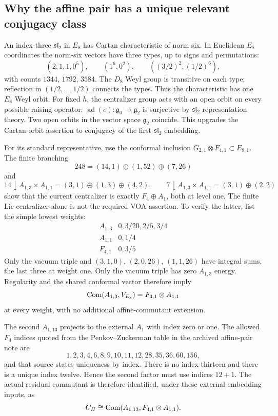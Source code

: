 \subsection{Why the affine pair has a unique relevant conjugacy class}

An index-three $\mathfrak{sl}_2$ in $E_8$ has Cartan characteristic
of norm six. In Euclidean $E_8$ coordinates the norm-six vectors
have three types, up to signs and permutations:
\[
 (2,1,1,0^5),\qquad (1^6,0^2),\qquad
 ((3/2)^2,(1/2)^6),
\]
with counts $1344$, $1792$, $3584$. The $D_8$ Weyl group is
transitive on each type; reflection in
$(1/2,\ldots,1/2)$ connects the types. Thus the characteristic
has one $E_8$ Weyl orbit. For fixed $h$, the centralizer group
acts with an open orbit on every possible raising operator:
$\operatorname{ad}(e):\mathfrak g_0\to\mathfrak g_2$ is
surjective by $\mathfrak{sl}_2$ representation theory. Two open
orbits in the vector space $\mathfrak g_2$ coincide. This
upgrades the Cartan-orbit assertion to conjugacy of the first
$\mathfrak{sl}_2$ embedding.

For its standard representative, use the conformal inclusion
$G_{2,1}\otimes F_{4,1}\subset E_{8,1}$. The finite branching
\[
 248=(14,1)\oplus(1,52)\oplus(7,26)
\]
and
\[
 14\downarrow A_{1,3}\times A_{1,1}
 =(3,1)\oplus(1,3)\oplus(4,2),
 \qquad
 7\downarrow A_{1,3}\times A_{1,1}=(3,1)\oplus(2,2)
\]
show that the current centralizer is exactly
$F_4\oplus A_1$, both at level one. The finite Lie centralizer
alone is not the required VOA assertion. To verify the latter,
list the simple lowest weights:
\[
\begin{array}{c|l}
A_{1,3}&0,3/20,2/5,3/4\\
A_{1,1}&0,1/4\\
F_{4,1}&0,3/5
\end{array}
\]
Only the vacuum triple and $(3,1,0)$, $(2,0,26)$, $(1,1,26)$
have integral sums, the last three at weight one. Only the
vacuum triple has zero $A_{1,3}$ energy. Regularity and the
shared conformal vector therefore imply
\[
 \operatorname{Com}(A_{1,3},V_{E_8})=F_{4,1}\otimes A_{1,1}
\]
at every weight, with no additional affine-commutant extension.

The second $A_{1,13}$ projects to the external $A_1$ with index
zero or one. The allowed $F_4$ indices quoted from the
Penkov--Zuckerman table in the archived affine-pair note are
\[
 1,2,3,4,6,8,9,10,11,12,28,35,36,60,156,
\]
and that source states uniqueness by index. There is no index
thirteen and there is a unique index twelve. Hence the second
factor must use indices $12+1$. The actual residual commutant is
therefore identified, under these external embedding inputs, as
\begin{equation}
 C_H\cong\operatorname{Com}(A_{1,13},F_{4,1}\otimes A_{1,1}).
 \label{expstructure:CH}
\end{equation}

